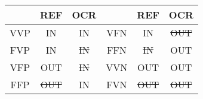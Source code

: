 \begin{tabular}{c|cc||c|cc}
\hline
		& REF	 & OCR	  & 	& REF	 &OCR\\
\hline
\hline
VVP		& IN	 & IN	  & VFN	& IN	 & \st{OUT}	\\
FVP		& IN     & \st{IN}& FFN	& \st{IN}& OUT	\\
\hline
\hline
VFP		& OUT	 &\st{IN} & VVN	& OUT	& OUT	\\
FFP		&\st{OUT}& IN	  & FVN	& \st{OUT}&\st{OUT}	\\
\hline
\end{tabular}